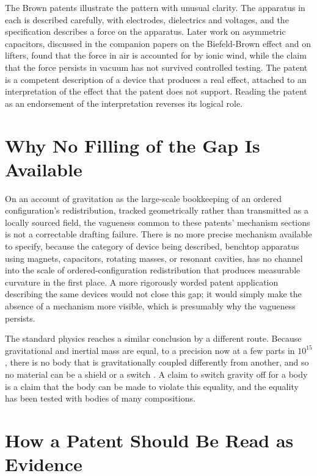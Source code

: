 \documentclass[11pt]{article}
\begin{document}
The Brown patents illustrate the pattern with unusual clarity. The apparatus in each is described carefully, with electrodes, dielectrics and voltages, and the specification describes a force on the apparatus. Later work on asymmetric capacitors, discussed in the companion papers on the Biefeld-Brown effect and on lifters, found that the force in air is accounted for by ionic wind, while the claim that the force persists in vacuum has not survived controlled testing. The patent is a competent description of a device that produces a real effect, attached to an interpretation of the effect that the patent does not support. Reading the patent as an endorsement of the interpretation reverses its logical role.

\section{Why No Filling of the Gap Is Available}

On an account of gravitation as the large-scale bookkeeping of an ordered configuration's redistribution, tracked geometrically rather than transmitted as a locally sourced field, the vagueness common to these patents' mechanism sections is not a correctable drafting failure. There is no more precise mechanism available to specify, because the category of device being described, benchtop apparatus using magnets, capacitors, rotating masses, or resonant cavities, has no channel into the scale of ordered-configuration redistribution that produces measurable curvature in the first place. A more rigorously worded patent application describing the same devices would not close this gap; it would simply make the absence of a mechanism more visible, which is presumably why the vagueness persists.

The standard physics reaches a similar conclusion by a different route. Because gravitational and inertial mass are equal, to a precision now at a few parts in $10^{15}$, there is no body that is gravitationally coupled differently from another, and so no material can be a shield or a switch \cite{T2022}. A claim to switch gravity off for a body is a claim that the body can be made to violate this equality, and the equality has been tested with bodies of many compositions.

\section{How a Patent Should Be Read as Evidence}
\end{document}
